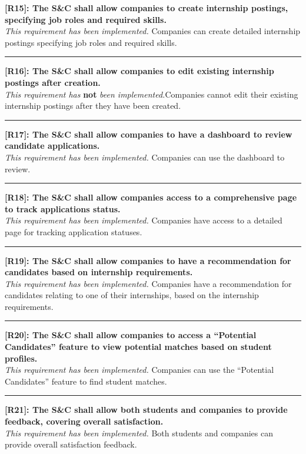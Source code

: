 \noindent\textbf{[R15]: The S\&C shall allow companies to create internship postings, specifying job roles and required skills.} \\
\textit{This requirement has been implemented.} Companies can create detailed internship postings specifying job roles and required skills.

\noindent\rule{16cm}{0.4pt}

\newpage

\textbf{[R16]: The S\&C shall allow companies to edit existing internship postings after creation.} \\
\textit{This requirement has} \textbf{not} \textit{been implemented.}Companies cannot edit their existing internship postings after they have been created.

\noindent\rule{16cm}{0.4pt}

\noindent\textbf{[R17]: The S\&C shall allow companies to have a dashboard to review candidate applications.} \\
\textit{This requirement has been implemented.} Companies can use the dashboard to review.

\noindent\rule{16cm}{0.4pt}

\noindent\textbf{[R18]: The S\&C shall allow companies access to a comprehensive page to track applications status.} \\
\textit{This requirement has been implemented.} Companies have access to a detailed page for tracking application statuses.

\noindent\rule{16cm}{0.4pt}

\noindent\textbf{[R19]: The S\&C shall allow companies to have a recommendation for candidates based on internship requirements.} \\
\textit{This requirement has been implemented.} Companies have a recommendation for candidates relating to one of their internships, based on the internship requirements. 

\noindent\rule{16cm}{0.4pt}

\noindent\textbf{[R20]: The S\&C shall allow companies to access a ``Potential Candidates'' feature to view potential matches based on student profiles.} \\
\textit{This requirement has been implemented.} Companies can use the ``Potential Candidates'' feature to find student matches.

\noindent\rule{16cm}{0.4pt}

\noindent\textbf{[R21]: The S\&C shall allow both students and companies to provide feedback, covering overall satisfaction.} \\
\textit{This requirement has been implemented.} Both students and companies can provide overall satisfaction feedback.

